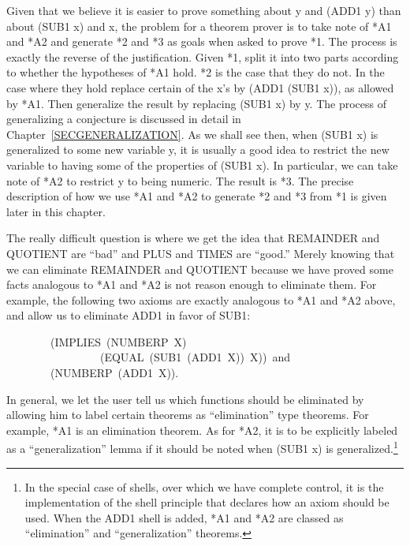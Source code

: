\documentclass[11pt]{book}
\newenvironment{pubasis}{\begin{flushleft}\ttfamily\small}{\normalsize\rmfamily\end{flushleft}}
\begin{document}
Given that we believe it is easier to prove something about y and (ADD1 y)
than about (SUB1 x) and x, the problem for a theorem prover is to take note of *A1 and *A2
and generate *2 and *3 as goals when asked to prove *1.  The process
is exactly the reverse of the justification.  Given *1, split it into
two parts according to whether the hypotheses of *A1 hold.  *2 is 
the case that they do not.  In the case where they hold replace certain of
the x's by (ADD1 (SUB1 x)), as allowed by *A1.  Then generalize the result
by replacing (SUB1 x) by y.  The process of generalizing a conjecture
is discussed in detail in Chapter~\ref{SECGENERALIZATION}.  As we shall see then,
when (SUB1 x) is generalized to some new variable y, it is usually a
good idea to restrict the new variable to having some of the properties
of (SUB1 x).  In particular, we can take note of *A2 to restrict y to
being numeric.  The result is *3.  The precise description of how we use
*A1 and *A2 to generate *2 and *3 from *1 is given later in this chapter.

The really difficult question is where we get the
idea that REMAINDER and QUOTIENT are ``bad''
and PLUS and TIMES are ``good.''  Merely
knowing that we can eliminate REMAINDER and QUOTIENT because we
have proved some facts analogous to *A1 and *A2 is not reason enough
to eliminate them.  For example, the following two axioms
are exactly analogous to
*A1 and *A2 above, and allow us to eliminate ADD1
in favor of SUB1:
\begin{pubasis}
~~~~~~~~(IMPLIES~(NUMBERP~X)\\
~~~~~~~~~~~~~~~~~(EQUAL~(SUB1~(ADD1~X))~X))~and\\

~~~~~~~~(NUMBERP~(ADD1~X)).\\
\end{pubasis}
In general, we let the user tell us which functions should be eliminated
by allowing him to label certain theorems as ``elimination''
type theorems.  For example, *A1 is an elimination theorem.
As for *A2, it 
is to be explicitly labeled as a ``generalization'' lemma if it
should be noted when (SUB1 x) is generalized.\footnote{In the special case of shells, over which we have complete control, it is the implementation of the shell principle that declares how an axiom should be used.  When the ADD1 shell is added, *A1 and *A2 are classed as ``elimination'' and ``generalization'' theorems.}
\end{document}
